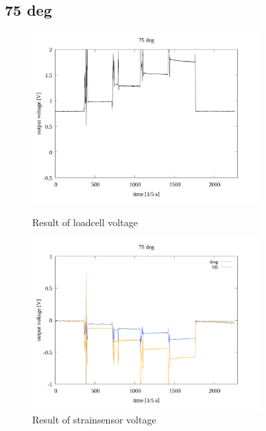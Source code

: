 \documentclass[twocolumn,a4j]{jsarticle}
\begin{document}
\subsection{75 deg}
\begin{figure}[htbp]
    \footnotesize
    \begin{center}
        \includegraphics[width=88mm]{../images/reverse/75_loadcell.png}
        \caption{Result of loadcell voltage}
        \includegraphics[width=88mm]{../images/reverse/75_strainsensor.png}
        \caption{Result of strainsensor voltage}
    \end{center}
\end{figure}

\newpage
\end{document}

